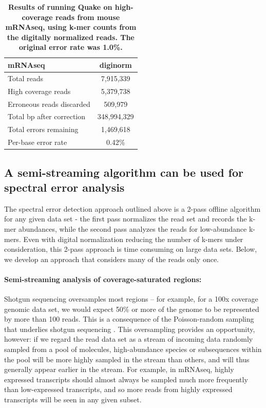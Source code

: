 \documentclass{article}
\begin{document}

\begin{table}
\centering
\begin{tabular}{|l|c|}
\hline
{\bf mRNAseq}                    & diginorm \\
\hline
Total reads                      & 7,915,339 \\
High coverage reads              & 5,379,738 \\
Erroneous reads discarded        & 509,979 \\
Total bp after correction        & 348,994,329 \\
Total errors remaining           & 1,469,618 \\
Per-base error rate              & 0.42\% \\
\hline
\end{tabular}

\caption{{\bf Results of running Quake on high-coverage reads from
    mouse mRNAseq, using k-mer counts from the digitally normalized reads.
    The original error rate was 1.0\%.}}

\label{tab:quake_mrna}
\end{table}

\subsection{A semi-streaming algorithm can be used for spectral error analysis}

The spectral error detection approach outlined above is a 2-pass
offline algorithm for any given data set - the first pass normalizes
the read set and records the k-mer abundances, while the second pass
analyzes the reads for low-abundance k-mers.  Even with digital
normalization reducing the number of k-mers under consideration, this
2-pass approach is time consuming on large data sets.  Below, we
develop an approach that considers many of the
reads only once.

\paragraph{Semi-streaming analysis of coverage-saturated regions:}

Shotgun sequencing oversamples most regions -- for example, for a 100x
coverage genomic data set, we would expect 50\% or more of the genome
to be represented by more than 100 reads.  This is a consequence of
the Poisson-random sampling that underlies shotgun sequencing \cite{Waterman}.
This oversampling provides an opportunity, however: if we
regard the read data set as a stream of incoming data randomly sampled
from a pool of molecules, high-abundance species or subsequences
within the pool will be more highly sampled in the stream than others,
and will thus generally appear earlier in the stream.  For example, in
mRNAseq, highly expressed transcripts should almost always be
sampled much more frequently than low-expressed transcripts, and so more
reads from highly expressed transcripts will be seen in any given
subset.
\end{document}
